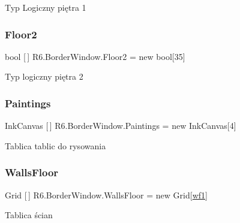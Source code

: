 Typ Logiczny piętra 1 

\mbox{\label{class_r6_1_1_border_window_a08f590f0e50727c447b137e55454e9d8}} 
\subsubsection{\texorpdfstring{Floor2}{Floor2}}
{\footnotesize\ttfamily bool \mbox{[}$\,$\mbox{]} R6.\+Border\+Window.\+Floor2 = new bool\mbox{[}35\mbox{]}\hspace{0.3cm}{\ttfamily [private]}}



Typ logiczny piętra 2 

\mbox{\label{class_r6_1_1_border_window_aed1eaf9832ca05835a3a3375fcfd46c0}} 
\subsubsection{\texorpdfstring{Paintings}{Paintings}}
{\footnotesize\ttfamily Ink\+Canvas \mbox{[}$\,$\mbox{]} R6.\+Border\+Window.\+Paintings = new Ink\+Canvas\mbox{[}4\mbox{]}\hspace{0.3cm}{\ttfamily [private]}}



Tablica tablic do rysowania 

\mbox{\label{class_r6_1_1_border_window_ab935e3b07814c16d3bda8739d094242b}} 
\subsubsection{\texorpdfstring{WallsFloor}{WallsFloor}}
{\footnotesize\ttfamily Grid \mbox{[}$\,$\mbox{]} R6.\+Border\+Window.\+Walls\+Floor = new Grid\mbox{[}\mbox{\hyperlink{class_r6_1_1_border_window_a516c0f0a2b98623da65e1bb69f4629a9}{wf1}}\mbox{]}\hspace{0.3cm}{\ttfamily [private]}}



Tablica ścian 

